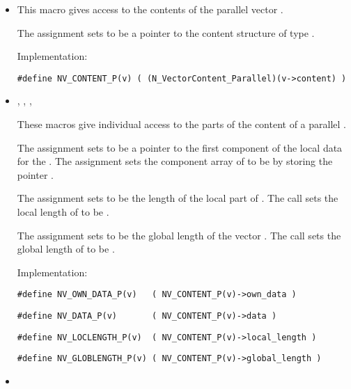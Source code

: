 \begin{itemize}

\item 

  This macro gives access to the contents of the parallel
  vector .
  
  The assignment  sets       
   to be a pointer to the  content    
  structure of type .
  
  Implementation:
  
  \verb|#define NV_CONTENT_P(v) ( (N_VectorContent_Parallel)(v->content) )|
  
\item 
  , , 
  , 
  
  These macros give individual access to the parts of    
  the content of a parallel .                        
  
  The assignment  sets  to be     
  a pointer to the first component of the local data for the  . 
  The assignment  sets the component array of 
   to be  by storing the pointer .                   
  
  The assignment  sets  to be     
  the length of the local part of . 
  The call  sets      
  the local length of  to be .
  
  The assignment  sets  to  
  be the global length of the vector .                    
  The call  sets the global       
  length of  to be .
  
  Implementation:
  
  \verb|#define NV_OWN_DATA_P(v)   ( NV_CONTENT_P(v)->own_data )|

  \verb|#define NV_DATA_P(v)       ( NV_CONTENT_P(v)->data )|

  \verb|#define NV_LOCLENGTH_P(v)  ( NV_CONTENT_P(v)->local_length )|

  \verb|#define NV_GLOBLENGTH_P(v) ( NV_CONTENT_P(v)->global_length )|
  
\item {}


\end{itemize}
